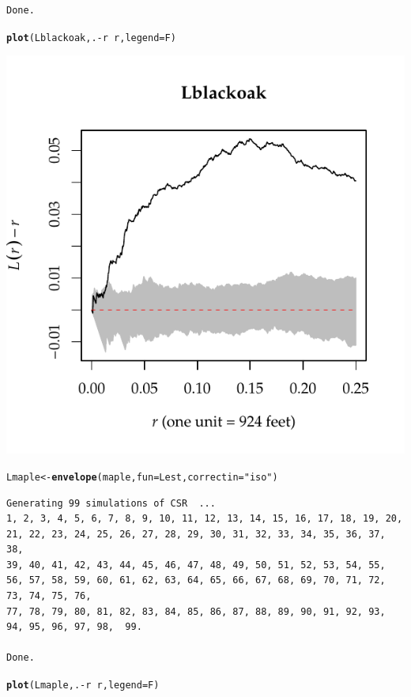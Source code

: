 \documentclass{article}\usepackage[]{graphicx}\usepackage[]{color}
\makeatletter
\def\maxwidth{ %
  \ifdim\Gin@nat@width>\linewidth
    \linewidth
  \else
    \Gin@nat@width
  \fi
}
\newcommand{\hlstr}[1]{\textcolor[rgb]{0.192,0.494,0.8}{#1}}%
\newcommand{\hlopt}[1]{\textcolor[rgb]{0,0,0}{#1}}%
\newcommand{\hlstd}[1]{\textcolor[rgb]{0.345,0.345,0.345}{#1}}%
\newcommand{\hlkwb}[1]{\textcolor[rgb]{0.69,0.353,0.396}{#1}}%
\newcommand{\hlkwc}[1]{\textcolor[rgb]{0.333,0.667,0.333}{#1}}%
\newcommand{\hlkwd}[1]{\textcolor[rgb]{0.737,0.353,0.396}{\textbf{#1}}}%
\newenvironment{kframe}{%
 \def\at@end@of@kframe{}%
 \ifinner\ifhmode%
  \def\at@end@of@kframe{\end{minipage}}%
  \begin{minipage}{\columnwidth}%
 \fi\fi%
 \def\FrameCommand##1{\hskip\@totalleftmargin \hskip-\fboxsep
 \colorbox{shadecolor}{##1}\hskip-\fboxsep
     \hskip-\linewidth \hskip-\@totalleftmargin \hskip\columnwidth}%
 \MakeFramed {\advance\hsize-\width
   \@totalleftmargin\z@ \linewidth\hsize
   \@setminipage}}%
 {\par\unskip\endMakeFramed%
 \at@end@of@kframe}
\newenvironment{knitrout}{}{} %
\makeatother
\begin{document}
\begin{enumerate}
\begin{enumerate}
\begin{knitrout}
\begin{kframe}
\begin{verbatim}
Done.
\end{verbatim}
\begin{alltt}
\hlkwd{plot}\hlstd{(Lblackoak,.}\hlopt{-}\hlstd{r}\hlopt{~}\hlstd{r,}\hlkwc{legend}\hlstd{=F)}
\end{alltt}
\end{kframe}

{\centering \includegraphics[width=\maxwidth]{figure/prob3c-1} 

}


\begin{kframe}\begin{alltt}
\hlstd{Lmaple}\hlkwb{<-}\hlkwd{envelope}\hlstd{(maple,}\hlkwc{fun}\hlstd{=Lest,}\hlkwc{correctin}\hlstd{=}\hlstr{"iso"}\hlstd{)}
\end{alltt}
\begin{verbatim}
Generating 99 simulations of CSR  ...
1, 2, 3, 4, 5, 6, 7, 8, 9, 10, 11, 12, 13, 14, 15, 16, 17, 18, 19, 20, 21, 22, 23, 24, 25, 26, 27, 28, 29, 30, 31, 32, 33, 34, 35, 36, 37, 38,
39, 40, 41, 42, 43, 44, 45, 46, 47, 48, 49, 50, 51, 52, 53, 54, 55, 56, 57, 58, 59, 60, 61, 62, 63, 64, 65, 66, 67, 68, 69, 70, 71, 72, 73, 74, 75, 76,
77, 78, 79, 80, 81, 82, 83, 84, 85, 86, 87, 88, 89, 90, 91, 92, 93, 94, 95, 96, 97, 98,  99.

Done.
\end{verbatim}
\begin{alltt}
\hlkwd{plot}\hlstd{(Lmaple,.}\hlopt{-}\hlstd{r}\hlopt{~}\hlstd{r,}\hlkwc{legend}\hlstd{=F)}
\end{alltt}
\end{kframe}


\end{knitrout}
\end{enumerate}
\end{enumerate}
\end{document}
